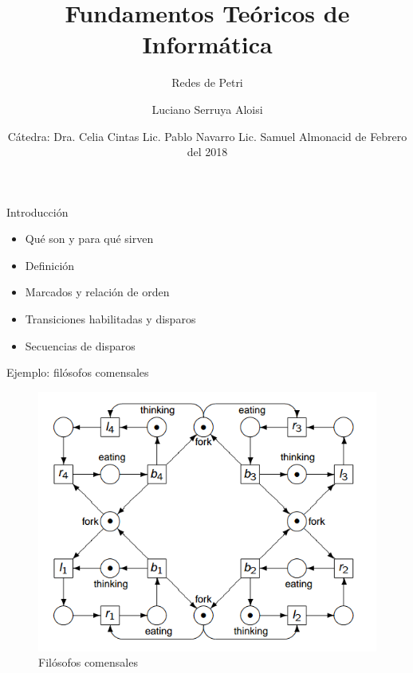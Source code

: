 \documentclass[
compress,
xcolor=table,
dvipsnames,
]{beamer}
\title[\arabic{page} ]{Fundamentos Teóricos de Informática}
\subtitle[RP]{Redes de Petri}
\author{Luciano Serruya Aloisi}
\institute[UNPSJB]{Universidad Nacional de la Patagonia San Juan Bosco}
\date{
    Cátedra: \endgraf 
    Dra. Celia Cintas\endgraf 
    Lic. Pablo Navarro\endgraf 
    Lic. Samuel Almonacid\endgraf
    \medskip
    \medskip 
    22 de Febrero del 2018
}
\begin{document}
\begin{frame}[plain]
    \begin{titlepage}
        
    \end{titlepage}
\end{frame}




\begin{frame}{Introducción}
    \begin{itemize}
        \item Qué son y para qué sirven
        \item{Definición}
        \item{Marcados y relación de orden}
        \item{Transiciones habilitadas y disparos}
        \item{Secuencias de disparos}
    \end{itemize}
\end{frame}

\begin{frame}{Ejemplo: filósofos comensales}
    \begin{figure}[h]
        \includegraphics[scale=0.45]{graphics/dining_philosophers.png}
        \caption{Filósofos comensales \citep{Labri}}
    \end{figure}
\end{frame}
\end{document}
